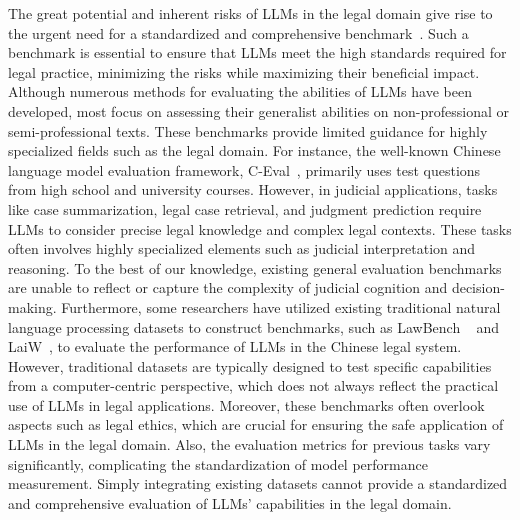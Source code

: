 The great potential and inherent risks of LLMs in the legal domain give rise to the urgent need for a standardized and comprehensive benchmark~\cite{sun2023short,T2Ranking}. Such a benchmark is essential to ensure that LLMs meet the high standards required for legal practice, minimizing the risks while maximizing their beneficial impact.
Although numerous methods for evaluating the abilities of LLMs have been developed, most focus on assessing their generalist abilities on non-professional or semi-professional texts. These benchmarks provide limited guidance for highly specialized fields such as the legal domain\cite{zhong2023agieval,huang2023c,chalkidis2021lexglue}.
For instance, the well-known Chinese language model evaluation framework, C-Eval~\cite{huang2023c}, primarily uses test questions from high school and university courses.  However, in judicial applications, tasks like case summarization, legal case retrieval, and judgment prediction require LLMs to consider precise legal knowledge and complex legal contexts. These tasks often involves highly specialized elements such as judicial interpretation and reasoning. To the best of our knowledge, existing general evaluation benchmarks are unable to reflect or capture the complexity of judicial cognition and decision-making. 
Furthermore, some researchers have utilized existing traditional natural language processing datasets to construct benchmarks, such as LawBench ~\cite{fei2023lawbench} and LaiW~\cite{dai2023laiw}, to evaluate the performance of LLMs in the Chinese legal system.
However, traditional datasets are typically designed to test specific capabilities from a computer-centric perspective, which does not always reflect the practical use of LLMs in legal applications. Moreover, these benchmarks often overlook aspects such as legal ethics, which are crucial for ensuring the safe application of LLMs in the legal domain.
Also, the evaluation metrics for previous tasks vary significantly, complicating the standardization of model performance measurement.
Simply integrating existing datasets cannot provide a standardized and comprehensive evaluation of LLMs' capabilities in the legal domain.


